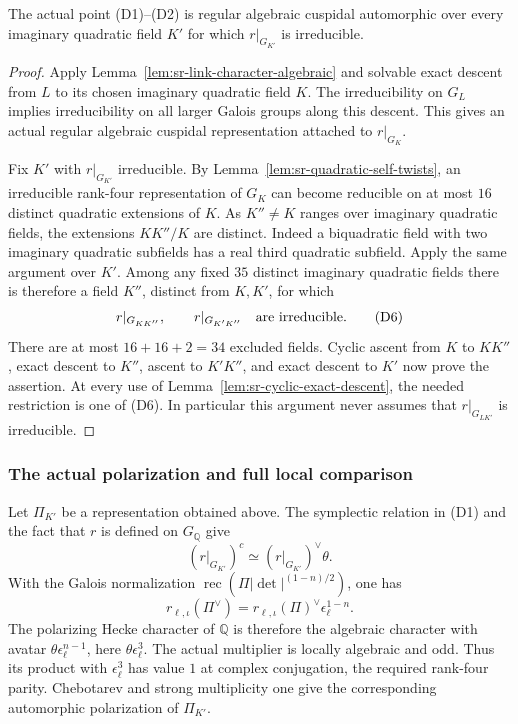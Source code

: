 \begin{srproposition}\label{prop:sr-all-quadratic-automorphy}
The actual point (D1)--(D2) is regular algebraic cuspidal
automorphic over every imaginary quadratic field \(K'\)
for which \(r|_{G_{K'}}\) is irreducible.
\end{srproposition}
\begin{proof}
Apply Lemma~\ref{lem:sr-link-character-algebraic}
and solvable exact descent from \(L\) to its chosen
imaginary quadratic field \(K\).
The irreducibility on \(G_L\) implies irreducibility
on all larger Galois groups along this descent.
This gives an actual regular algebraic cuspidal
representation attached to \(r|_{G_K}\).

Fix \(K'\) with \(r|_{G_{K'}}\) irreducible.
By Lemma~\ref{lem:sr-quadratic-self-twists}, an irreducible
rank-four representation of \(G_K\) can become reducible
on at most \(16\) distinct quadratic extensions of \(K\).
As \(K''\ne K\) ranges over imaginary quadratic fields,
the extensions \(KK''/K\) are distinct.
Indeed a biquadratic field with two imaginary quadratic
subfields has a real third quadratic subfield.
Apply the same argument over \(K'\).
Among any fixed \(35\) distinct imaginary quadratic fields
there is therefore a field \(K''\), distinct from \(K,K'\),
for which
\[
                r|_{G_{KK''}},\qquad r|_{G_{K'K''}}
                         \quad\hbox{are irreducible}.
 \tag{D6}
\]
There are at most \(16+16+2=34\) excluded fields.
Cyclic ascent from \(K\) to \(KK''\), exact descent to
\(K''\), ascent to \(K'K''\), and exact descent to \(K'\)
now prove the assertion.
At every use of Lemma~\ref{lem:sr-cyclic-exact-descent},
the needed restriction is one of (D6).
In particular this argument never assumes that
\(r|_{G_{LK'}}\) is irreducible.
\end{proof}

\subsubsection{The actual polarization and full local comparison}
Let \(\Pi_{K'}\) be a representation obtained above.
The symplectic relation in (D1) and the fact that \(r\)
is defined on \(G_{\mathbb Q}\) give
\[
              (r|_{G_{K'}})^c
                    \simeq(r|_{G_{K'}})^\vee\theta .
\]
With the Galois normalization
\(\operatorname{rec}(\Pi|\det|^{(1-n)/2})\),
one has
\[
 r_{\ell,\iota}(\Pi^\vee)
       =r_{\ell,\iota}(\Pi)^\vee\epsilon_\ell^{1-n}.
\]
The polarizing Hecke character of \(\mathbb Q\) is therefore
the algebraic character with avatar
\(\theta\epsilon_\ell^{n-1}\), here
\(\theta\epsilon_\ell^3\).
The actual multiplier is locally algebraic and odd.
Thus its product with \(\epsilon_\ell^3\) has value \(1\)
at complex conjugation, the required rank-four parity.
Chebotarev and strong multiplicity one give the
corresponding automorphic polarization of \(\Pi_{K'}\).

